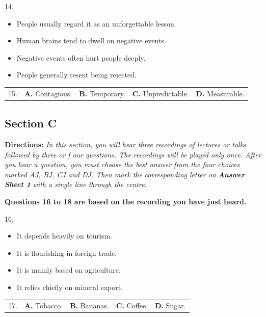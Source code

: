 \documentclass[UTF8,11pt]{ctexart}
\begin{document}
14.


\begin{itemize}[leftmargin=2em,itemsep=.2em,topsep=.4em]\item[A.] People usually regard it as an unforgettable lesson.
\item[B.] Human brains tend to dwell on negative events.
\item[C.] Negative events often hurt people deeply.
\item[D.] People generally resent being rejected.
\end{itemize}

\noindent\begin{tabularx}{\linewidth}{@{}lXXXX@{}}15. & \textbf{A.} Contagious. & \textbf{B.} Temporary. & \textbf{C.} Unpredictable. & \textbf{D.} Measurable.\\\end{tabularx}\par

\subsection*{\textbf{Section C}}


\textbf{Directions: }\textit{In this section, you will hear three recordings of lectures or talks followed by three} \textit{or f our questions. The recordings will be played only once. After you hear a question, you must} \textit{choose the best answer from the four choices marked AJ, BJ, CJ and DJ. Then mark the} \textit{corresponding letter on }\textbf{\textit{Answer Sheet 1 }}\textit{with a single line through the centre.}


\textbf{Questions 16 to 18 are based on the recording you have just heard.}


16.


\begin{itemize}[leftmargin=2em,itemsep=.2em,topsep=.4em]\item[A.] It depends heavily on tourism.
\item[B.] It is flourishing in foreign trade.
\item[C.] It is mainly based on agriculture.
\item[D.] It relies chiefly on mineral export.
\end{itemize}

\noindent\begin{tabularx}{\linewidth}{@{}lXXXX@{}}17. & \textbf{A.} Tobacco. & \textbf{B.} Bananas. & \textbf{C.} Coffee. & \textbf{D.} Sugar.\\\end{tabularx}\par
\end{document}
